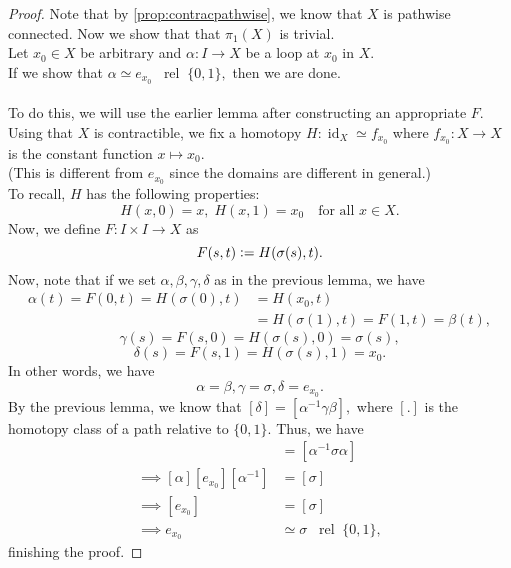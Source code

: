 \documentclass[12pt]{article}
\theoremstyle{definition}
\numberwithin{thm}{section}
\newcommand{\rel}{\;\;\operatorname{rel}\;}
\newcommand{\id}{\operatorname{id}}
\begin{document}
\begin{proof} 
	Note that by \cref{prop:contracpathwise}, we know that $X$ is pathwise connected. Now we show that that $\pi_1(X)$ is trivial.\\
	Let $x_0 \in X$ be arbitrary and $\alpha:I\to X$ be a loop at $x_0$ in $X.$\\
	If we show that $\alpha \simeq e_{x_0} \rel \{0, 1\},$ then we are done.\\~\\
	To do this, we will use the earlier lemma after constructing an appropriate $F.$\\
	Using that $X$ is contractible, we fix a homotopy $H:\id_X \simeq f_{x_0}$ where $f_{x_0}:X\to X$ is the constant function $x \mapsto x_0.$\\
	(This is different from $e_{x_0}$ since the domains are different in general.)\\
	To recall, $H$ has the following properties:
	\begin{equation*} 
		H(x, 0) = x,\; H(x, 1) = x_0 \quad \text{for all } x \in X.
	\end{equation*}
	Now, we define $F:I\times I \to X$ as 
	\begin{equation*} 
		F(s, t) \vcentcolon= H(\sigma(s), t).
	\end{equation*}
	Now, note that if we set $\alpha, \beta, \gamma, \delta$ as in the previous lemma, we have
	\begin{align*} 
		\alpha(t) = F(0, t) = H(\sigma(0), t) &= H(x_0, t)\\
		&= H(\sigma(1), t) = F(1, t) = \beta(t),
	\end{align*}
	\begin{equation*} 
		\gamma(s) = F(s, 0) = H(\sigma(s), 0) = \sigma(s),
	\end{equation*}
	\begin{equation*} 
		\delta(s) = F(s, 1) = H(\sigma(s), 1) = x_0.
	\end{equation*}
	In other words, we have
	\begin{equation*} 
		\alpha = \beta, \gamma = \sigma, \delta = e_{x_0}.
	\end{equation*}
	By the previous lemma, we know that $[\delta] = [\alpha^{-1}\gamma\beta],$ where $[.]$ is the homotopy class of a path relative to $\{0, 1\}.$ Thus, we have
	\begin{align*} 
		[e_{x_0}] &= [\alpha^{-1}\sigma\alpha]\\
		\implies [\alpha][e_{x_0}][\alpha^{-1}] &= [\sigma]\\
		\implies [e_{x_0}] &= [\sigma]\\
		\implies e_{x_0} &\simeq \sigma \rel \{0, 1\},
	\end{align*}
	finishing the proof.
\end{proof}
\end{document}
